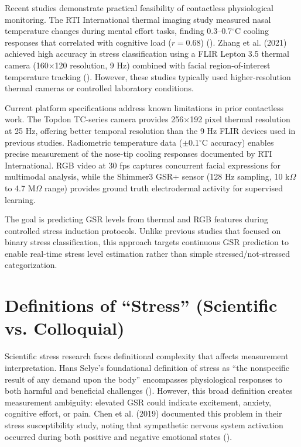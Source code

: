 Recent studies demonstrate practical feasibility of contactless physiological monitoring. The RTI International thermal imaging study measured nasal temperature changes during mental effort tasks, finding 0.3--0.7$^\circ$C cooling responses that correlated with cognitive load ($r = 0.68$) (\citep{ref6}). Zhang et al. (2021) achieved high accuracy in stress classification using a FLIR Lepton 3.5 thermal camera (160$\times$120 resolution, 9 Hz) combined with facial region-of-interest temperature tracking (\citep{ref5}). However, these studies typically used higher-resolution thermal cameras or controlled laboratory conditions.

Current platform specifications address known limitations in prior contactless work. The Topdon TC-series camera provides 256$\times$192 pixel thermal resolution at 25 Hz, offering better temporal resolution than the 9 Hz FLIR devices used in previous studies. Radiometric temperature data ($\pm$0.1$^\circ$C accuracy) enables precise measurement of the nose-tip cooling responses documented by RTI International. RGB video at 30 fps captures concurrent facial expressions for multimodal analysis, while the Shimmer3 GSR+ sensor (128 Hz sampling, 10 k$\Omega$ to 4.7 M$\Omega$ range) provides ground truth electrodermal activity for supervised learning.

The goal is predicting GSR levels from thermal and RGB features during controlled stress induction protocols. Unlike previous studies that focused on binary stress classification, this approach targets continuous GSR prediction to enable real-time stress level estimation rather than simple stressed/not-stressed categorization.


\section{Definitions of ``Stress'' (Scientific vs. Colloquial)}
Scientific stress research faces definitional complexity that affects measurement interpretation. Hans Selye's foundational definition of stress as ``the nonspecific result of any demand upon the body'' encompasses physiological responses to both harmful and beneficial challenges (\citep{ref11}). However, this broad definition creates measurement ambiguity: elevated GSR could indicate excitement, anxiety, cognitive effort, or pain. Chen et al. (2019) documented this problem in their stress susceptibility study, noting that sympathetic nervous system activation occurred during both positive and negative emotional states (\citep{ref4}).

